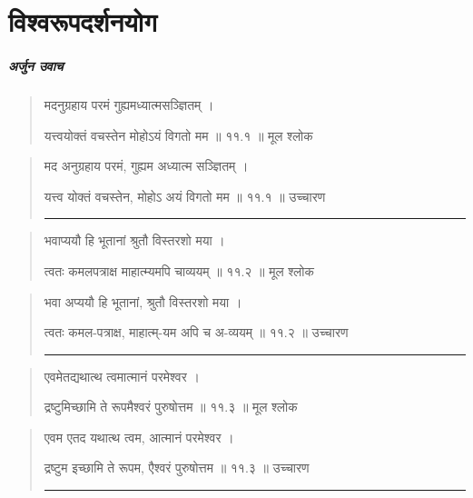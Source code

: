 \chapter{\sanskrit विश्वरूपदर्शनयोग}
\paragraph{\sanskrit अर्जुन उवाच}
\begin{quotation} 
मदनुग्रहाय परमं गुह्यमध्यात्मसञ्ज्ञितम्‌  ।  

यत्त्वयोक्तं वचस्तेन मोहोऽयं विगतो मम  ॥ ११.१ ॥  मूल श्लोक
\end{quotation}

\begin{quotation}

मद अनुग्रहाय परमं, गुह्यम अध्यात्म सञ्ज्ञितम्‌  ।  

यत्त्व योक्तं वचस्तेन, मोहोऽ अयं विगतो मम  ॥ ११.१ ॥  उच्चारण

\noindent\rule{16cm}{0.4pt} 
\end{quotation}


\begin{quotation} 

भवाप्ययौ हि भूतानां श्रुतौ विस्तरशो मया  ।  

त्वतः कमलपत्राक्ष माहात्म्यमपि चाव्ययम्‌  ॥ ११.२ ॥  मूल श्लोक
\end{quotation}

\begin{quotation}

भवा अप्ययौ हि भूतानां, श्रुतौ विस्तरशो मया  ।  

त्वतः कमल-पत्राक्ष, माहात्म्-यम अपि च अ-व्ययम्‌  ॥ ११.२ ॥  उच्चारण

\noindent\rule{16cm}{0.4pt} 
\end{quotation}


\begin{quotation} 

एवमेतद्यथात्थ त्वमात्मानं परमेश्वर  ।  

द्रष्टुमिच्छामि ते रूपमैश्वरं पुरुषोत्तम  ॥ ११.३ ॥  मूल श्लोक
\end{quotation}

\begin{quotation}

एवम एतद यथात्थ त्वम, आत्मानं परमेश्वर  ।  

द्रष्टुम इच्छामि ते रूपम, एैश्वरं पुरुषोत्तम  ॥ ११.३ ॥  उच्चारण

\noindent\rule{16cm}{0.4pt} 
\end{quotation}



